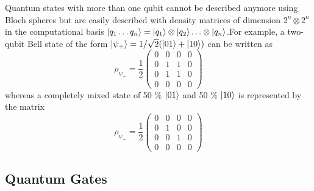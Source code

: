 \smallskip

Quantum states with more than one qubit cannot be described anymore using Bloch spheres but are easily described with density matrices of dimension $2^n\otimes 2^n$ in the computational basis $\left| q_1\hdots q_n \right>=\left| q_1 \right>\otimes\left| q_{2} \right>\hdots\otimes\left| q_n \right>$.For example, a two-qubit Bell state of the form $\left| \psi_+ \right>=1/\sqrt{2}(\left| 01 \right>+\left| 10 \right>)$ can be written as
%
\begin{equation}
\rho_{\psi_+} = \frac{1}{2}\left( \begin{array}{cccc} 0 & 0 & 0 & 0 \\ 0 & 1 & 1 & 0 \\ 0 & 1 & 1 & 0 \\ 0 & 0 & 0 & 0 \end{array} \right)
\end{equation}
%
whereas a completely mixed state of 50 \% $\left| 01 \right>$ and 50 \% $\left| 10 \right>$ is represented by the matrix
%
\begin{equation}
\rho_{\psi_+} = \frac{1}{2}\left( \begin{array}{cccc} 0 & 0 & 0 & 0 \\ 0 & 1 & 0 & 0 \\ 0 & 0 & 1 & 0 \\ 0 & 0 & 0 & 0 \end{array} \right)
\end{equation}
%

\subsection{Quantum Gates}

